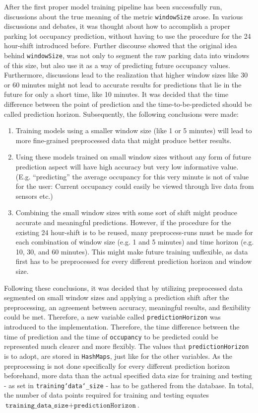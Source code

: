 After the first proper model training pipeline has been successfully run, discussions about the true meaning of the metric \texttt{windowSize} arose. In various discussions and debates, it was thought about how to accomplish a proper parking lot occupancy prediction, without having to use the procedure for the 24 hour-shift introduced before. Further discourse showed that the original idea behind \texttt{windowSize}, was not only to segment the raw parking data into windows of this size, but also use it as a way of predicting future occupancy values. Furthermore, discussions lead to the realization that higher window sizes like 30 or 60 minutes might not lead to accurate results for predictions that lie in the future for only a short time, like 10 minutes. It was decided that the time difference between the point of prediction and the time-to-be-predicted should be called prediction horizon. Subsequently, the following conclusions were made: 

\begin{enumerate}
	\item Training models using a smaller window size (like 1 or 5 minutes) will lead to more fine-grained preprocessed data that might produce better results.
\item Using these models trained on small window sizes without any form of future prediction aspect will have high accuracy but very low informative value. (E.g. “predicting” the average occupancy for this very minute is not of value for the user: Current occupancy could easily be viewed through live data from sensors etc.)
\item Combining the small window sizes with some sort of shift might produce accurate and meaningful predictions. However, if the procedure for the existing 24 hour-shift is to be reused, many preprocess-runs must be made for each combination of window size (e.g. 1 and 5 minutes) and time horizon (e.g. 10, 30, and 60 minutes). This might make future training unflexible, as data first has to be preprocessed for every different prediction horizon and window size.
\end{enumerate}

Following these conclusions, it was decided that by utilizing preprocessed data segmented on small window sizes and applying a prediction shift after the preprocessing, an agreement between accuracy, meaningful results, and flexibility could be met. Therefore, a new variable called \texttt{predictionHorizon} was introduced to the implementation. Therefore, the time difference between the time of prediction and the time of \texttt{occupancy} to be predicted could be represented much clearer and more flexibly. The values that \texttt{predictionHorizon} is to adopt, are stored in \texttt{HashMaps}, just like for the other variables. As the preprocessing is not done specifically for every different prediction horizon beforehand, more data than the actual specified data size for training and testing - as set in \texttt{training\char`data\char`_size} - has to be gathered from the database. In total, the number of data points required for training and testing equates $\texttt{training\char`_data\char`_size} + \texttt{predictionHorizon}$.


